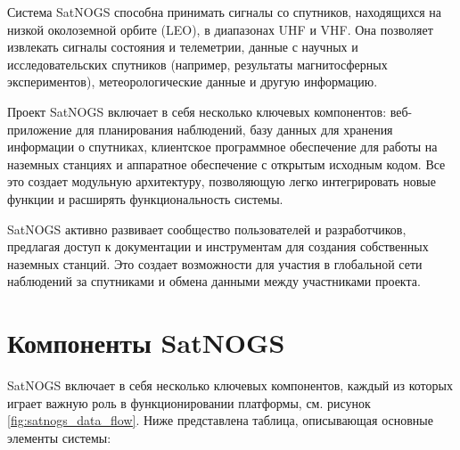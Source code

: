 \documentclass[14pt, a4paper]{src/bsu}
\begin{document}
Система SatNOGS способна принимать сигналы со спутников, находящихся на низкой
околоземной орбите (LEO), в диапазонах UHF и VHF. Она позволяет извлекать
сигналы состояния и телеметрии, данные с научных и исследовательских спутников
(например, результаты магнитосферных экспериментов), метеорологические данные и
другую информацию.

Проект SatNOGS включает в себя несколько ключевых компонентов: веб-приложение
для планирования наблюдений, базу данных для хранения информации о спутниках,
клиентское программное обеспечение для работы на наземных станциях и аппаратное
обеспечение с открытым исходным кодом. Все это создает модульную архитектуру,
позволяющую легко интегрировать новые функции и расширять функциональность
системы.

SatNOGS активно развивает сообщество пользователей и разработчиков, предлагая
доступ к документации и инструментам для создания собственных наземных станций.
Это создает возможности для участия в глобальной сети наблюдений за спутниками
и обмена данными между участниками проекта.

\section{Компоненты SatNOGS}

SatNOGS включает в себя несколько ключевых компонентов, каждый из которых
играет важную роль в функционировании платформы, см. рисунок
\ref{fig:satnogs_data_flow}. Ниже представлена таблица, описывающая основные
элементы системы:
\end{document}

